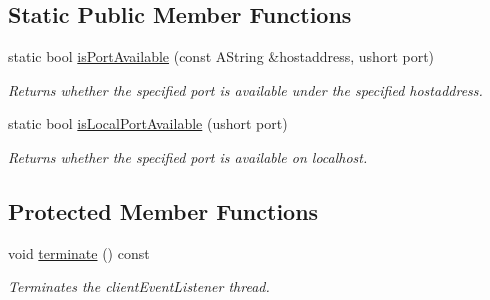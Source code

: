 \subsection*{Static Public Member Functions}
\begin{DoxyCompactItemize}
\item 
static bool \mbox{\hyperlink{class_tcp_socket_a133a664281c276c9e75d961175814d7d}{is\+Port\+Available}} (const A\+String \&hostaddress, ushort port)
\begin{DoxyCompactList}\small\item\em Returns whether the specified port is available under the specified hostaddress. \end{DoxyCompactList}\item 
static bool \mbox{\hyperlink{class_tcp_socket_a411dcd4e6875ed636eb96cdac1ab18b9}{is\+Local\+Port\+Available}} (ushort port)
\begin{DoxyCompactList}\small\item\em Returns whether the specified port is available on localhost. \end{DoxyCompactList}\end{DoxyCompactItemize}
\subsection*{Protected Member Functions}
\begin{DoxyCompactItemize}
\item 
\mbox{\label{class_tcp_socket_a606fe5b41ef0e54fd42a45caf9966f94}} 
void \mbox{\hyperlink{class_tcp_socket_a606fe5b41ef0e54fd42a45caf9966f94}{terminate}} () const
\begin{DoxyCompactList}\small\item\em Terminates the client\+Event\+Listener thread. \end{DoxyCompactList}\end{DoxyCompactItemize}
